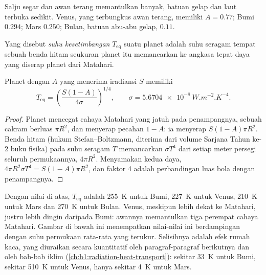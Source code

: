 Salju segar dan awan terang memantulkan banyak, batuan gelap dan laut terbuka sedikit. Venus, yang terbungkus awan terang, memiliki $A = 0.77$; Bumi $0.294$; Mars $0.250$; Bulan, batuan abu-abu gelap, $0.11$.

\begin{definition}\label{def:b1:comparative-planetology:equilibrium-temperature}
Yang disebut \emph{suhu kesetimbangan} $T_\mathrm{eq}$ suatu planet adalah suhu seragam tempat sebuah benda hitam seukuran planet itu memancarkan ke angkasa tepat daya yang diserap planet dari Matahari.
\end{definition}

\begin{proposition}\label{prop:b1:comparative-planetology:teq}
Planet dengan  $A$ yang menerima iradiansi $S$ memiliki
\[
  T_\mathrm{eq} = \left(\frac{S(1 - A)}{4\sigma}\right)^{1/4},
  \qquad \sigma = \qty{5.6704e-8}{W.m^{-2}.K^{-4}} .
\]
\end{proposition}

\begin{proof}
Planet mencegat cahaya Matahari yang jatuh pada penampangnya, sebuah cakram berluas $\pi R^2$, dan menyerap pecahan $1 - A$: ia menyerap $S(1 - A)\pi
R^2$. Benda hitam (hukum Stefan--Boltzmann, diterima dari volume Sarjana Tahun ke-2 buku fisika) pada suhu seragam $T$ memancarkan $\sigma T^4$ dari setiap meter persegi seluruh permukaannya, $4\pi R^2$. Menyamakan kedua daya, $4\pi R^2\sigma T^4 = S(1 - A)\pi R^2$, dan faktor 4 adalah perbandingan luas bola dengan penampangnya.
\end{proof}

Dengan nilai di atas, $T_\mathrm{eq}$ adalah \qty{255}{K} untuk Bumi,
\qty{227}{K} untuk Venus, \qty{210}{K} untuk Mars dan \qty{270}{K} untuk Bulan. Venus, meskipun lebih dekat ke Matahari, justru lebih dingin daripada Bumi: awannya memantulkan tiga perempat cahaya Matahari. Gambar di bawah ini menempatkan nilai-nilai ini berdampingan dengan suhu permukaan rata-rata yang terukur. Selisihnya adalah efek rumah kaca, yang diuraikan secara kuantitatif oleh paragraf-paragraf berikutnya dan oleh bab-bab iklim (\cref{ch:b1:radiation-heat-transport}): sekitar \qty{33}{K} untuk Bumi, sekitar \qty{510}{K} untuk Venus, hanya sekitar \qty{4}{K} untuk Mars.

